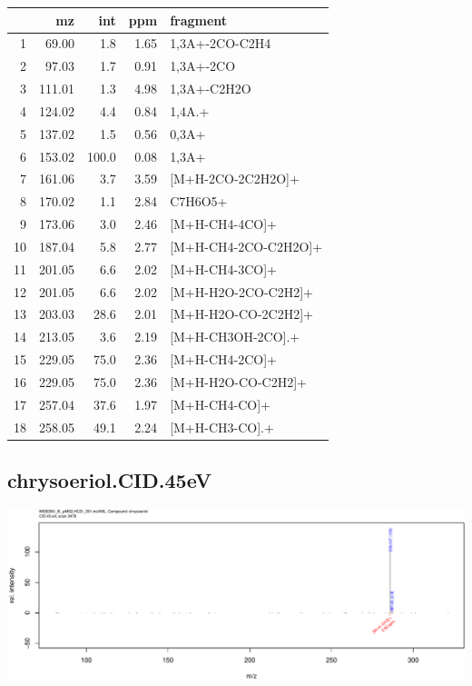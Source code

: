 \documentclass[]{article}
\begin{document}
\begin{table}[ht]
\centering
\begin{tabular}{rrrrl}
  \toprule
 & mz & int & ppm & fragment \\ 
  \midrule
1 & 69.00 & 1.8 & 1.65 & 1,3A+-2CO-C2H4 \\ 
  2 & 97.03 & 1.7 & 0.91 & 1,3A+-2CO \\ 
  3 & 111.01 & 1.3 & 4.98 & 1,3A+-C2H2O \\ 
  4 & 124.02 & 4.4 & 0.84 & 1,4A.+ \\ 
  5 & 137.02 & 1.5 & 0.56 & 0,3A+ \\ 
  6 & 153.02 & 100.0 & 0.08 & 1,3A+ \\ 
  7 & 161.06 & 3.7 & 3.59 & [M+H-2CO-2C2H2O]+ \\ 
  8 & 170.02 & 1.1 & 2.84 & C7H6O5+ \\ 
  9 & 173.06 & 3.0 & 2.46 & [M+H-CH4-4CO]+ \\ 
  10 & 187.04 & 5.8 & 2.77 & [M+H-CH4-2CO-C2H2O]+ \\ 
  11 & 201.05 & 6.6 & 2.02 & [M+H-CH4-3CO]+ \\ 
  12 & 201.05 & 6.6 & 2.02 & [M+H-H2O-2CO-C2H2]+ \\ 
  13 & 203.03 & 28.6 & 2.01 & [M+H-H2O-CO-2C2H2]+ \\ 
  14 & 213.05 & 3.6 & 2.19 & [M+H-CH3OH-2CO].+ \\ 
  15 & 229.05 & 75.0 & 2.36 & [M+H-CH4-2CO]+ \\ 
  16 & 229.05 & 75.0 & 2.36 & [M+H-H2O-CO-C2H2]+ \\ 
  17 & 257.04 & 37.6 & 1.97 & [M+H-CH4-CO]+ \\ 
  18 & 258.05 & 49.1 & 2.24 & [M+H-CH3-CO].+ \\ 
   \bottomrule
\end{tabular}
\end{table}

\clearpage\subsection{chrysoeriol.CID.45eV}
\includegraphics[width=\textwidth]{WEB350_files/figure-latex/unnamed-chunk-3-22}
\end{document}
